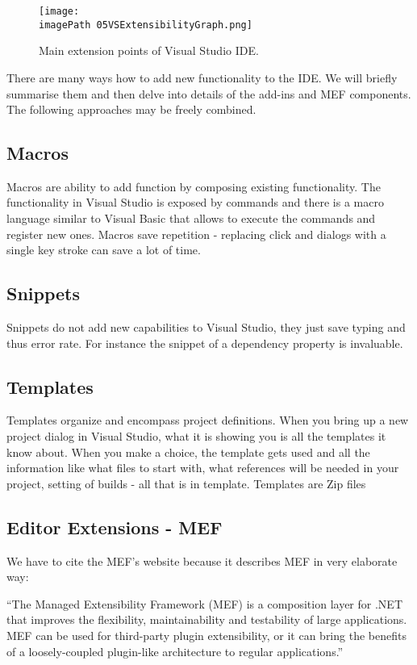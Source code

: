  \begin{figure}
	\centering
		\texttt{[image: \\imagePath 05VSExtensibilityGraph.png]}
		\caption{Main extension points of Visual Studio IDE. }
	\label{fig:05VSExtensibilityGraph}
\end{figure}

There are many ways how to add new functionality to the IDE. We will briefly summarise them and then delve into details of the add-ins and MEF components. The following approaches may be freely combined.

\subsection{Macros}
Macros are ability to add function by composing existing functionality. The functionality in Visual Studio is exposed by commands and  there is a macro language similar to Visual Basic that allows to execute the commands and register new ones. Macros save repetition - replacing click and dialogs with a single key stroke can save a lot of time.

\subsection{Snippets}
Snippets do not add new capabilities to Visual Studio, they just save typing and thus error rate. For instance the snippet of a dependency property is invaluable.

\subsection{Templates}
Templates organize and encompass project definitions. When you bring up a new project dialog in Visual Studio, what it is showing you is all the templates it know about. When you make a choice, the template gets used and all the information like what files to start with, what references will be needed in your project, setting of builds - all that is in template. Templates are Zip files

\subsection{Editor Extensions - MEF}
We have to cite the MEF's website because it describes MEF in very elaborate way:

``The Managed Extensibility Framework (MEF) is a composition layer for .NET that improves the flexibility, maintainability and testability of large applications. MEF can be used for third-party plugin extensibility, or it can bring the benefits of a loosely-coupled plugin-like architecture to regular applications.''\cite{MEFpage}

